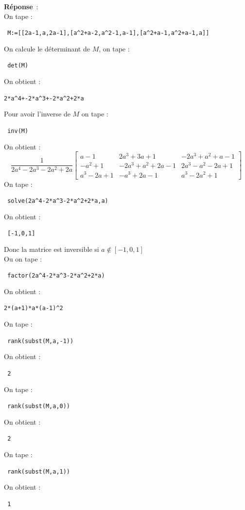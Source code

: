 \documentclass{article}
\begin{document}
\begin{enumerate}
{\bf R\'eponse}~:\\
On tape :
\begin{center}
 \verb| M:=[[2a-1,a,2a-1],[a^2+a-2,a^2-1,a-1],[a^2+a-1,a^2+a-1,a]] |
\end{center}
On calcule le d\'eterminant de $M$, on tape :
\begin{center}
\verb| det(M)|
\end{center}
On obtient :
\begin{center}\verb|2*a^4+-2*a^3+-2*a^2+2*a|\end{center}
Pour avoir l'inverse de $M$ on tape :
\begin{center}
\verb| inv(M)|
\end{center}
On obtient :
$$ \frac{1}{2a^4-2a^3-2a^2+2a}\left[
\begin{array}{ccc}
a-1 & 2a^3+3a+1 & -2a^3+a^2+a-1\\
-a^2+1 & -2a^3+a^2+2a-1 & 2a^3-a^2-2a+1\\
a^3-2a+1 & -a^3+2a-1 & a^3-2a^2+1
\end{array}
\right] $$
On tape :
\begin{center}
\verb| solve(2a^4-2*a^3-2*a^2+2*a,a)|
\end{center}
On obtient :
\begin{center}\verb| [-1,0,1]|\end{center}
Donc la matrice est inversible si $a \not\in [-1,0,1]$\\
Ou on tape :
\begin{center}
\verb| factor(2a^4-2*a^3-2*a^2+2*a)|
\end{center}
On obtient :
\begin{center}\verb|2*(a+1)*a*(a-1)^2|\end{center}
On tape :
\begin{center}
\verb| rank(subst(M,a,-1))|
\end{center}
On obtient :
\begin{center}
\verb| 2|
\end{center}
On tape :
\begin{center}
\verb| rank(subst(M,a,0))|
\end{center}
On obtient :
\begin{center}
\verb| 2|
\end{center}
On tape :
\begin{center}
\verb| rank(subst(M,a,1))|
\end{center}
On obtient :
\begin{center}
\verb| 1|
\end{center}

\end{enumerate}
\end{document}

